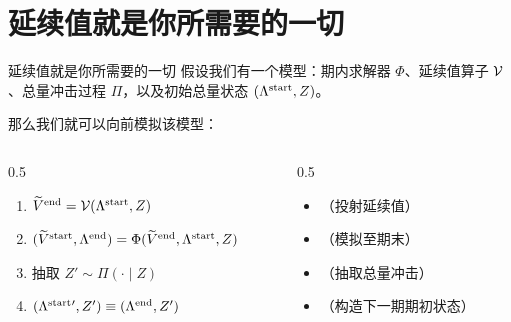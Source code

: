 \documentclass[10pt,aspectratio=169]{beamer}
\begin{document}
\section[CVIAYN]{延续值就是你所需要的一切}

\begin{frame}{延续值就是你所需要的一切}
  假设我们有一个模型：期内求解器 $\Phi$、延续值算子 $\mathcal{V}$、总量冲击过程 $\Pi$，以及初始总量状态 $(\Lambda^{\mathrm{start}}, Z)$。

  那么我们就可以向前模拟该模型：
  \begin{columns}
    \begin{column}[T]{0.5\textwidth}
      \begin{enumerate}
        \item $\widetilde{V}^{\mathrm{end}} = \mathcal{V}(\Lambda^{\mathrm{start}}, Z)$
        \item $(\widetilde{V}^{\mathrm{start}}, \Lambda^{\mathrm{end}}) = \Phi(\widetilde{V}^{\mathrm{end}}, \Lambda^{\mathrm{start}}, Z)$
        \item 抽取 $Z' \sim \Pi(\cdot \mid Z)$
        \item $(\Lambda^{\mathrm{start}}{}', Z') \equiv (\Lambda^{\mathrm{end}}, Z')$
      \end{enumerate}
    \end{column}
    \begin{column}[T]{0.5\textwidth}
      \begin{itemize}
        \item[] （投射延续值）
        \item[] （模拟至期末）
        \item[] （抽取总量冲击）
        \item[] （构造下一期期初状态）
      \end{itemize}
    \end{column}
  \end{columns}
\end{frame}
\end{document}
